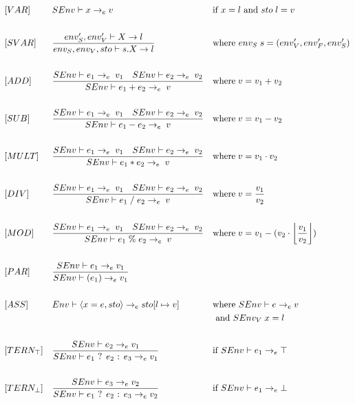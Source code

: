 \begin{align*}
&[VAR] & &SEnv \vdash x \rightarrow_e v & &\text{if } x = l \text{ and } sto\; l = v\\\\
&[SVAR] & &\frac{env_S^\prime, env_V^\prime \vdash X \rightarrow l}{env_S, env_V, sto \vdash s.X \rightarrow l} & &\text{where } env_S\; s = (env_V^\prime, env_F^\prime, env_S^\prime)\\\\
&[ADD] & &\frac{SEnv \vdash e_1 \rightarrow_e\; v_1\quad SEnv \vdash e_2 \rightarrow_e\; v_2}{SEnv \vdash e_1 + e_2 \rightarrow_e\; v} & &\text{where}\; v = v_1 + v_2\\\\
&[SUB] & &\frac{SEnv \vdash e_1 \rightarrow_e\; v_1\quad SEnv \vdash e_2 \rightarrow_e\; v_2}{SEnv \vdash e_1 - e_2 \rightarrow_e\; v} & &\text{where}\; v = v_1 - v_2\\\\
&[MULT] & &\frac{SEnv \vdash e_1 \rightarrow_e\; v_1\quad SEnv \vdash e_2 \rightarrow_e\; v_2}{SEnv \vdash e_1 * e_2 \rightarrow_e\; v} & &\text{where}\; v = v_1 \cdot v_2\\\\
&[DIV] & &\frac{SEnv \vdash e_1 \rightarrow_e\; v_1\quad SEnv \vdash e_2 \rightarrow_e\; v_2}{SEnv \vdash e_1\; /\; e_2 \rightarrow_e\; v} & &\text{where}\; v = \frac{v_1}{v_2}\\\\
&[MOD] & &\frac{SEnv \vdash e_1 \rightarrow_e\; v_1\quad SEnv \vdash e_2 \rightarrow_e\; v_2}{SEnv \vdash e_1\; \%\; e_2 \rightarrow_e\; v} & &\text{where}\; v = v_1 - (v_2 \cdot \floor*{\frac{v_1}{v_2}})\\\\
&[PAR] & &\frac{SEnv \vdash e_1 \rightarrow_e v_1}{SEnv \vdash (e_1) \rightarrow_e v_1}\\\\
&[ASS] & &Env \vdash \langle x = e, sto \rangle \rightarrow_e sto[l \mapsto v] & &\text{where } SEnv \vdash e \rightarrow_e v\\
& & & & &\text{ and } SEnv_V\; x = l\\\\
&[TERN_\top] & &\frac{SEnv \vdash e_2 \rightarrow_e v_1}{SEnv \vdash e_1 \text{ ? } e_2 \text{ : } e_3 \rightarrow_e v_1} & &\text{if } SEnv \vdash e_1 \rightarrow_e \top\\\\
&[TERN_\bot] & &\frac{SEnv \vdash e_3 \rightarrow_e v_2}{SEnv \vdash e_1 \text{ ? } e_2 \text{ : } e_3 \rightarrow_e v_2} & &\text{if } SEnv \vdash e_1 \rightarrow_e \bot\\\\

\end{align*}
